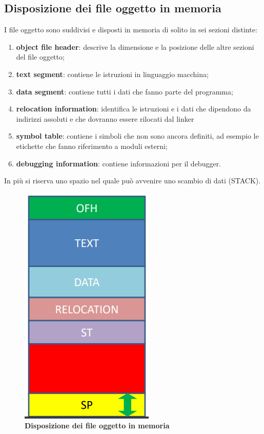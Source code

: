 \documentclass[12pt]{article}
\begin{document}
\subsection{Disposizione dei file oggetto in memoria}
I file oggetto sono suddivisi e disposti in memoria di solito in sei sezioni distinte:
\begin{enumerate}
    \item \textbf{object file header}: descrive la dimensione e la posizione delle altre sezioni del file oggetto;
    \item \textbf{text segment}: contiene le istruzioni in linguaggio macchina;
    \item \textbf{data segment}: contiene tutti i dati che fanno parte del programma;
    \item  \textbf{relocation information}: identifica le istruzioni e i dati che dipendono da indirizzi assoluti e che dovranno essere rilocati dal linker
    \item \textbf{symbol table}: contiene i simboli che non sono ancora definiti, ad esempio le etichette che fanno riferimento a moduli esterni;
    \item \textbf{debugging information}: contiene informazioni per il debugger.
\end{enumerate}
In più si riserva uno spazio nel quale può avvenire uno scambio di dati (STACK).\par\medskip\noindent 
\begin{figure}[h]
    \centering
    \includegraphics[width=0.30\linewidth]{disposizione file oggetto.png}
    \caption{\textbf{Disposizione dei file oggetto in memoria}}
    \label{fig:enter-label}
\end{figure}
\newpage
\end{document}
